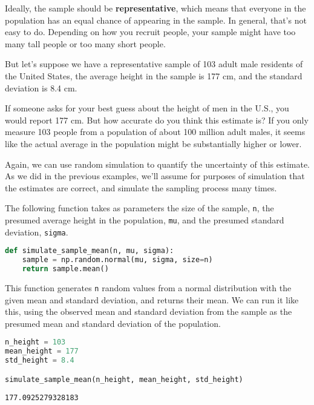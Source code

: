 Ideally, the sample should be \textbf{representative}, which means that
everyone in the population has an equal chance of appearing in the
sample. In general, that's not easy to do. Depending on how you recruit
people, your sample might have too many tall people or too many short
people.

But let's suppose we have a representative sample of 103 adult male
residents of the United States, the average height in the sample is 177
cm, and the standard deviation is 8.4 cm.

If someone asks for your best guess about the height of men in the U.S.,
you would report 177 cm. But how accurate do you think this estimate is?
If you only measure 103 people from a population of about 100 million
adult males, it seems like the actual average in the population might be
substantially higher or lower.

Again, we can use random simulation to quantify the uncertainty of this
estimate. As we did in the previous examples, we'll assume for purposes
of simulation that the estimates are correct, and simulate the sampling
process many times.

The following function takes as parameters the size of the sample,
\passthrough{\lstinline!n!}, the presumed average height in the
population, \passthrough{\lstinline!mu!}, and the presumed standard
deviation, \passthrough{\lstinline!sigma!}.

\begin{lstlisting}[language=Python,style=source]
def simulate_sample_mean(n, mu, sigma):
    sample = np.random.normal(mu, sigma, size=n)
    return sample.mean()
\end{lstlisting}

This function generates \passthrough{\lstinline!n!} random values from a
normal distribution with the given mean and standard deviation, and
returns their mean. We can run it like this, using the observed mean and
standard deviation from the sample as the presumed mean and standard
deviation of the population.

\begin{lstlisting}[language=Python,style=source]
n_height = 103
mean_height = 177
std_height = 8.4

simulate_sample_mean(n_height, mean_height, std_height)
\end{lstlisting}

\begin{lstlisting}[style=output]
177.0925279328183
\end{lstlisting}


